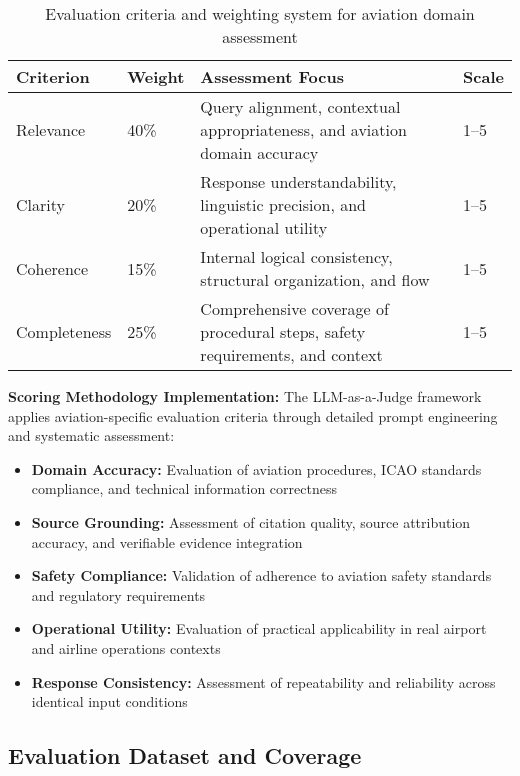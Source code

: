 \begin{table}[H]
\centering
\caption{Evaluation criteria and weighting system for aviation domain assessment}
\label{tab:criteria_s3}
\begin{tabular}{|p{3cm}|p{2cm}|p{6cm}|p{2cm}|}
\hline
\textbf{Criterion} & \textbf{Weight} & \textbf{Assessment Focus} & \textbf{Scale} \\
\hline
Relevance & 40\% & Query alignment, contextual appropriateness, and aviation domain accuracy & 1--5 \\
\hline
Clarity & 20\% & Response understandability, linguistic precision, and operational utility & 1--5 \\
\hline
Coherence & 15\% & Internal logical consistency, structural organization, and flow & 1--5 \\
\hline
Completeness & 25\% & Comprehensive coverage of procedural steps, safety requirements, and context & 1--5 \\
\hline
\end{tabular}
\end{table}

\textbf{Scoring Methodology Implementation:}
The LLM-as-a-Judge framework applies aviation-specific evaluation criteria through detailed prompt engineering and systematic assessment:

\begin{itemize}
    \item \textbf{Domain Accuracy:} Evaluation of aviation procedures, ICAO standards compliance, and technical information correctness
    \item \textbf{Source Grounding:} Assessment of citation quality, source attribution accuracy, and verifiable evidence integration
    \item \textbf{Safety Compliance:} Validation of adherence to aviation safety standards and regulatory requirements
    \item \textbf{Operational Utility:} Evaluation of practical applicability in real airport and airline operations contexts
    \item \textbf{Response Consistency:} Assessment of repeatability and reliability across identical input conditions
\end{itemize}

\subsection{Evaluation Dataset and Coverage}
\label{subsec:evaluation_dataset_s3}

